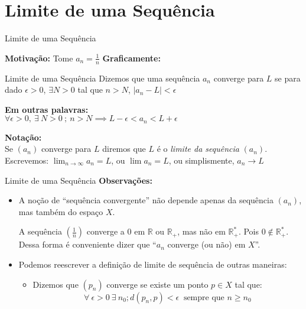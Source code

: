 \documentclass[hyperref={pdfpagelabels=false}]{beamer}
\begin{document}
\section{Limite de uma Sequência}
\begin{frame}{Limite de uma Sequência}
 
 {\bf Motivação:} Tome $a_n = \displaystyle \frac{1}{n}$ \pause
 {\bf Graficamente:} \pause
 
 \begin{definition}{Limite de uma Sequência}
  Dizemos que uma sequência $a_n$ converge para $L$ se para dado $\epsilon > 0$, $\exists N > 0$ tal que $n > N$, $|a_n - L| < \epsilon$
 \end{definition} \pause
 {\bf Em outras palavras:} \\ \pause
 $\forall \epsilon >0, ~\exists ~N > 0 ~;~ n > N \implies L-\epsilon < a_n < L + \epsilon$ \\ \pause
 
 {\bf Notação:} \\ \pause Se $(a_n)$ converge para $L$ diremos que $L$ é o \emph{limite da sequência} $(a_n)$. \pause
 Escrevemos: $\displaystyle\lim_{n\to\infty}a_n = L$, ou $\lim a_n = L$, ou simplismente, $a_n \to L$
 
\end{frame}

\begin{frame}{Limite de uma Sequência}
 {\bf Observações:} \pause
 \begin{itemize}
  \item A noção de ``sequência convergente'' não depende apenas da sequência $(a_n)$, mas também do espaço $X$. \pause
  \begin{example}
   A sequência $\left(\displaystyle \frac{1}{n} \right)$ converge a $0$ em $\mathbb{R}$ ou $\mathbb{R}_+$, mas não em $\mathbb{R}_{+}^{*}$. \pause Pois $0 \notin \mathbb{R}_{+}^{*}$. \pause Dessa forma é conveniente dizer que ``$a_n$ converge (ou não) em $X$''.
  \end{example} \pause
  \item Podemos reescrever a definição de limite de sequência de outras maneiras: \pause
  \begin{itemize}
   \item Dizemos que $(p_n)$ converge se existe um ponto $p \in X$ tal que:
   $$\forall ~ \epsilon > 0~ \exists ~ n_0; d(p_n,p)< \epsilon ~ \text{ sempre que } n \geq n_0$$
  \end{itemize}

 \end{itemize}

\end{frame}
\end{document}
